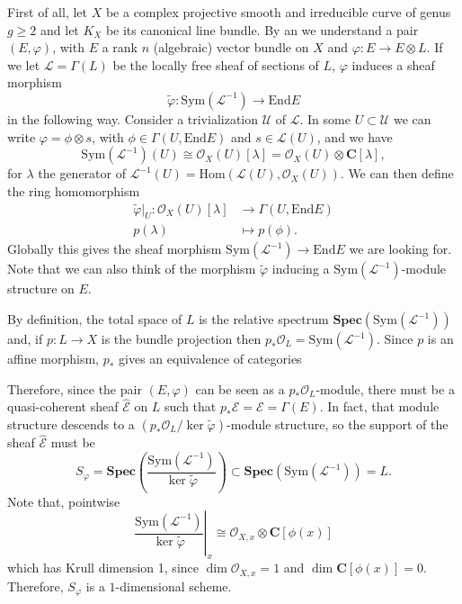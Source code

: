 \documentclass[12pt,a4paper]{book}
\theoremstyle{definition} \newtheorem{defn}[thm]{Definition}
\theoremstyle{definition} \newtheorem{ejemplo}[thm]{Example}
\theoremstyle{remark} \newtheorem{rem}[thm]{Remark}
\def\OO{\mathscr{O}}
\def\LL{\mathscr{L}}
\def\EE{\mathscr{E}}
\def\CC{\mathbf{C}}
\def\End{\mathrm{End}}
\def\Hom{\mathrm{Hom}}
\def\Sym{\mathrm{Sym}}
\def\RSpec{\mathbf{Spec}}
\let\emph\relax
\begin{document}
	      First of all, let $X$ be a complex projective smooth and irreducible curve of genus $g\geq 2$ and let $K_X$ be its canonical line bundle. By an \emph{$L$-twisted Higgs bundle} we understand a pair $(E,\varphi)$, with $E$ a rank $n$ (algebraic) vector bundle on $X$ and $\varphi:E\rightarrow E\otimes L$. If we let $\LL=\Gamma(L)$ be the locally free sheaf of sections of $L$, $\varphi$ induces a sheaf morphism
	      \begin{equation*}
		\tilde{\varphi}: \Sym(\LL^{-1}) \longrightarrow \End E
	      \end{equation*}
	      in the following way. Consider a trivialization $\mathcal{U}$ of $\LL$. In some $U\subset \mathcal{U}$ we can write  $\varphi=\phi \otimes s$, with $\phi \in \Gamma(U,\End E)$ and $s\in \LL(U)$, and we have
	      \begin{equation*}
		\Sym(\LL^{-1})(U) \cong  \OO_X(U)[\lambda]=\OO_X(U) \otimes \CC[\lambda],
	      \end{equation*}
	      for $\lambda$ the generator of $\LL^{-1}(U)=\Hom(\LL(U),\OO_X(U))$.
	      We can then define the ring homomorphism
	      \begin{align*}
		\tilde{\varphi}|_U:\OO_X(U)[\lambda]&\longrightarrow \Gamma(U,\End E)\\ 
		  p(\lambda) &\longmapsto p(\phi). 
		\end{align*}
		Globally this gives the sheaf morphism $\Sym(\LL^{-1})\rightarrow \End E$ we are looking for. Note that we can also think of the morphism $\tilde{\varphi}$ inducing a $\Sym(\LL^{-1})$-module structure on $E$.

		By definition, the total space of $L$ is the relative spectrum $\RSpec(\Sym(\LL^{-1}))$ and, if $p:L\rightarrow X$ is the bundle projection then $p_*\OO_L=\Sym(\LL^{-1})$. Since $p$ is an affine morphism, $p_*$ gives an equivalence of categories
  \begin{center}
  \end{center}
  Therefore, since the pair $(E,\varphi)$ can be seen as a $p_*\OO_L$-module, there must be a quasi-coherent sheaf $\hat{\EE}$ on $L$ such that $p_*\hat{\EE}=\EE=\Gamma(E)$. In fact, that module structure descends to a $(p_*\OO_L/\ker \tilde{\varphi})$-module structure, so the support of the sheaf $\hat{\EE}$ must be 
  \begin{equation*}
    S_\varphi= \RSpec\left( \frac{\Sym(\LL^{-1})}{\ker \tilde{\varphi}} \right)\subset \RSpec(\Sym(\LL^{-1}))=L.
  \end{equation*}
  Note that, pointwise
  \begin{equation*}
   \left.  \frac{\Sym(\LL^{-1})}{\ker \tilde{\varphi}}\right|_x \cong \OO_{X,x} \otimes \CC[\phi(x)]
  \end{equation*}
  which has Krull dimension 1, since $\dim \OO_{X,x}=1$ and $\dim \CC[\phi(x)]=0$. Therefore, $S_\varphi $ is a $1$-dimensional scheme. 
\end{document}
